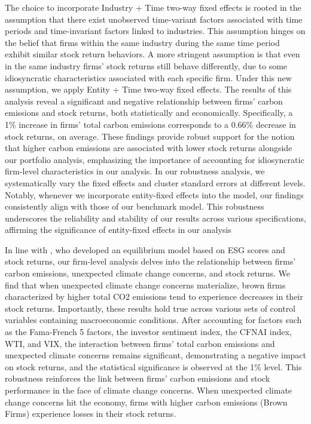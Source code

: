 \documentclass[12pt]{article}
\begin{document}
The choice to incorporate Industry + Time two-way fixed effects is rooted in the assumption that there exist unobserved time-variant factors associated with time periods and time-invariant factors linked to industries. This assumption hinges on the belief that firms within the same industry during the same time period exhibit similar stock return behaviors. A more stringent assumption is that even in the same industry firms' stock returns still behave differently, due to some idiosyncratic characteristics associated with each specific firm. Under this new assumption, we apply Entity + Time two-way fixed effects. The results of this analysis reveal a significant and negative relationship between firms' carbon emissions and stock returns, both statistically and economically. Specifically, a 1\% increase in firms' total carbon emissions corresponds to a 0.66\% decrease in stock returns, on average. These findings provide robust support for the notion that higher carbon emissions are associated with lower stock returns alongside our portfolio analysis, emphasizing the importance of accounting for idiosyncratic firm-level characteristics in our analysis. In our robustness analysis, we systematically vary the fixed effects and cluster standard errors at different levels. Notably, whenever we incorporate entity-fixed effects into the model, our findings consistently align with those of our benchmark model. This robustness underscores the reliability and stability of our results across various specifications, affirming the significance of entity-fixed effects in our analysis

In line with \cite{pastor2021sustainable}, who developed an equilibrium model based on ESG scores and stock returns, our firm-level analysis delves into the relationship between firms' carbon emissions, unexpected climate change concerns, and stock returns. We find that when unexpected climate change concerns materialize, brown firms characterized by higher total CO2 emissions tend to experience decreases in their stock returns. Importantly, these results hold true across various sets of control variables containing macroeconomic conditions. After accounting for factors such as the Fama-French 5 factors, the investor sentiment index, the CFNAI index, WTI, and VIX, the interaction between firms' total carbon emissions and unexpected climate concerns remains significant, demonstrating a negative impact on stock returns, and the statistical significance is observed at the 1\% level. This robustness reinforces the link between firms' carbon emissions and stock performance in the face of climate change concerns. When unexpected climate change concerns hit the economy, firms with higher carbon emissions (Brown Firms) experience losses in their stock returns. 
\end{document}
